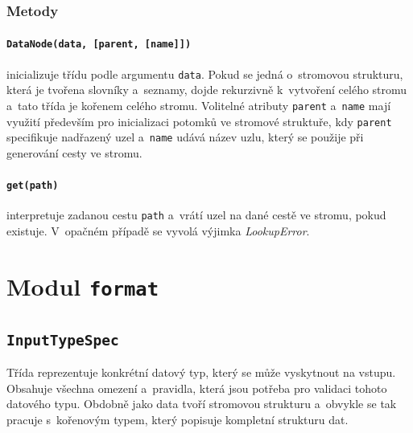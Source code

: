 \documentclass[FM,MP]{tulthesis}
\begin{document}
			\subsubsection{Metody}
				\paragraph{\texttt{DataNode(data, [parent, [name]])}}
					inicializuje třídu podle argumentu \texttt{data}. Pokud se jedná o~stromovou strukturu, která je tvořena slovníky a~seznamy, dojde rekurzivně k~vytvoření celého stromu a~tato třída je kořenem celého stromu. Volitelné atributy \texttt{parent} a~\texttt{name} mají využití především pro inicializaci potomků ve stromové struktuře, kdy \texttt{parent} specifikuje nadřazený uzel a~\texttt{name} udává název uzlu, který se použije při generování cesty ve stromu.
				\paragraph{\texttt{get(path)}}
					interpretuje zadanou cestu \texttt{path} a~vrátí uzel na dané cestě ve stromu, pokud existuje. V~opačném případě se vyvolá výjimka \textit{LookupError}.

	\section{Modul \texttt{format}}
		\subsection*{\texttt{InputTypeSpec}}
			\label{input-type-spec}
			Třída reprezentuje konkrétní datový typ, který se může vyskytnout na vstupu. Obsahuje všechna omezení a~pravidla, která jsou potřeba pro validaci tohoto datového typu. Obdobně jako data tvoří stromovou strukturu a~obvykle se tak pracuje s~kořenovým typem, který popisuje kompletní strukturu dat.
\end{document}
